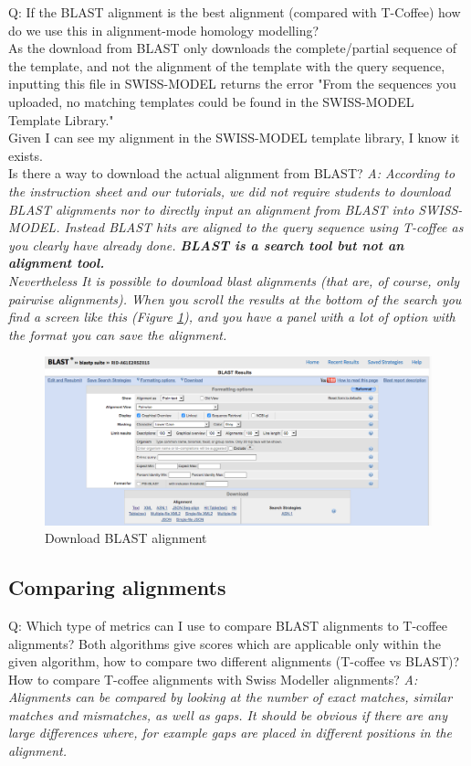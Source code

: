 \documentclass[10pt,a4paper]{article}
\begin{document}
Q: If the BLAST alignment is the best alignment (compared with T-Coffee) how do we use this in alignment-mode homology modelling? \\
As the download from BLAST only downloads the complete/partial sequence of the template, and not the alignment of the template with the query sequence, inputting this file in SWISS-MODEL returns the error "From the sequences you uploaded, no matching templates could be found in the SWISS-MODEL Template Library." \\
Given I can see my alignment in the SWISS-MODEL template library, I know it exists. \\
Is there a way to download the actual alignment from BLAST? \newline
\textit{A: According to the instruction sheet and our tutorials, we did not require students to download BLAST alignments nor to directly input an alignment from BLAST into SWISS-MODEL. Instead BLAST hits are aligned to the query sequence using T-coffee as you clearly have already done. \textbf{BLAST is a search tool but not an alignment tool.} \\
Nevertheless It is possible to download blast alignments (that are, of course, only pairwise alignments). When you scroll the results at the bottom of the search you find a screen like this (Figure \ref{figure:blastDl}), and you have a panel with a lot of option with the format you can save the alignment.} \newline
\begin{figure}[!ht]
\centering \includegraphics[width=1.2\textwidth]{blast_dl.png}
\caption{Download BLAST alignment}
\label{figure:blastDl}
\end{figure}


\subsection{Comparing alignments}
Q: Which type of metrics can I use to compare BLAST alignments to T-coffee alignments? Both algorithms give scores which are applicable only within the given algorithm, how to compare two different alignments (T-coffee vs BLAST)? \newline
How to compare T-coffee alignments with Swiss Modeller alignments? \newline
\textit{A: Alignments can be compared by looking at the number of exact matches, similar matches and mismatches, as well as gaps. It should be obvious if there are any large differences where, for example gaps are placed in different positions in the alignment. } \newline
\end{document}
